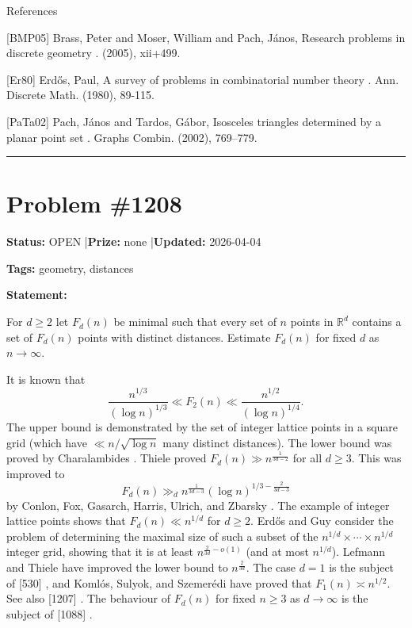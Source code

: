 \documentclass{article}
\begin{document}
References

[BMP05] Brass, Peter and Moser, William and Pach, J\'{a}nos, Research problems in discrete geometry . (2005), xii+499.

[Er80] Erd\H{o}s, Paul, A survey of problems in combinatorial number theory . Ann. Discrete Math. (1980), 89-115.

[PaTa02] Pach, J\'{a}nos and Tardos, G\'{a}bor, Isosceles triangles determined by a planar point set . Graphs Combin. (2002), 769--779.

\noindent\rule{\linewidth}{0.4pt}


\section{Problem \#1208}
\label{prob:1208}

\noindent\textbf{Status:} OPEN \quad|\quad \textbf{Prize:} none \quad|\quad \textbf{Updated:} 2026-04-04

\noindent\textbf{Tags:} geometry, distances

\medskip

\noindent\textbf{Statement:}

For $d\geq 2$ let $F_d(n)$ be minimal such that every set of $n$ points in $\mathbb{R}^d$ contains a set of $F_d(n)$ points with distinct distances. Estimate $F_d(n)$ for fixed $d$ as $n\to \infty$.




It is known that\[\frac{n^{1/3}}{(\log n)^{1/3}}\ll F_2(n) \ll \frac{n^{1/2}}{(\log n)^{1/4}}.\]The upper bound is demonstrated by the set of integer lattice points in a square grid (which have $\ll n/\sqrt{\log n}$ many distinct distances). The lower bound was proved by Charalambides \cite{Ch13}. Thiele \cite{Th95} proved $F_d(n) \gg n^{\frac{1}{3d-2}}$ for all $d\geq 3$. This was improved to\[F_d(n) \gg_d n^{\frac{1}{3d-3}}(\log n)^{1/3-\frac{2}{3d-3}}\]by Conlon, Fox, Gasarch, Harris, Ulrich, and Zbarsky \cite{CFGHUZ15}. The example of integer lattice points shows that $F_d(n)\ll n^{1/d}$ for $d\geq 2$. Erd\H{o}s and Guy \cite{ErGu70} consider the problem of determining the maximal size of such a subset of the $n^{1/d}\times\cdots \times n^{1/d}$ integer grid, showing that it is at least $n^{\frac{2}{3d}-o(1)}$ (and at most $n^{1/d}$). Lefmann and Thiele \cite{LeTh95} have improved the lower bound to $n^{\frac{2}{3d}}$. The case $d=1$ is the subject of [530] , and Koml\'{o}s, Sulyok, and Szemer\'{e}di \cite{KSS75} have proved that $F_1(n)\asymp n^{1/2}$. See also [1207] . The behaviour of $F_d(n)$ for fixed $n\geq 3$ as $d\to \infty$ is the subject of [1088] .
\end{document}
